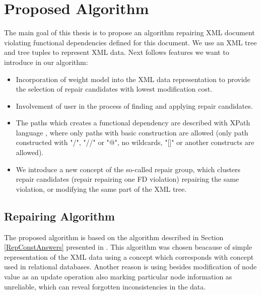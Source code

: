 \chapter{Proposed Algorithm}

The main goal of this thesis is to propose an algorithm repairing XML document violating functional dependencies defined for this document. We use an XML tree and tree tuples to represent XML data. Next follows features we want to introduce in our algorithm:

\begin{itemize}
	\item Incorporation of weight model into the XML data representation to provide the selection of repair candidates with lowest modification cost.
    \item Involvement of user in the process of finding and applying repair candidates.
    \item The paths which creates a functional dependency are described with XPath language \cite{xpath}, where only paths with basic construction are allowed (only path constructed with "/", "//" or "@", no wildcards, "[]" or another constructs are allowed).
    \item We introduce a new concept of the so-called repair group, which clusters repair candidates (repair repairing one FD violation) repairing the same violation, or modifying the same part of the XML tree.
\end{itemize}


\section{Repairing Algorithm}

The proposed algorithm is based on the algorithm described in Section \ref{RepConstAnswers} presented in \cite{RepAndConsistentAnswer}. This algorithm was chosen beacause of simple representation of the XML data using a concept which corresponds with concept used in relational databases. Another reason is using besides modification of node value as an update operation also marking particular node information as unreliable, which can reveal forgotten inconsistencies in the data.

